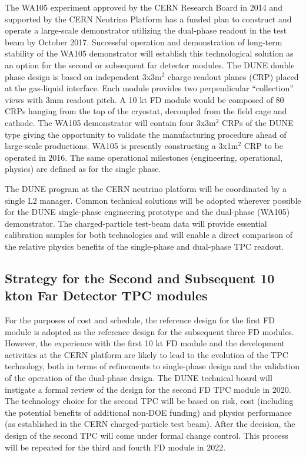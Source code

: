 The WA105 experiment approved by the CERN Research Board in 2014 and supported 
by the CERN Neutrino Platform has a funded plan to construct and operate a large-scale 
demonstrator utilizing the dual-phase readout in the test beam by October 2017. 
Successful operation and demonstration of long-term stability of the WA105 demonstrator 
will establish this technological solution as an option for the second or subsequent 
far detector modules. The DUNE double phase design is based on independent 3x3m$^2$
charge readout planes (CRP) placed at the gas-liquid interface. Each module provides 
two perpendicular ``collection'' views with 3mm readout pitch. A 10 kt FD module 
would be composed of 80 CRPs hanging from the top of the cryostat, decoupled from 
the field cage and cathode. The WA105 demonstrator will contain four 3x3m$^2$ 
CRPs of the DUNE type giving the opportunity to validate the manufacturing procedure 
ahead of large-scale productions. WA105 is presently constructing a 3x1m$^2$ 
CRP to be operated in 2016. The same operational milestones (engineering, operational, 
physics) are defined as for the single phase.

The DUNE program at the CERN neutrino platform will be coordinated by a single 
L2 manager. Common technical solutions will be adopted wherever possible for the 
DUNE single-phase engineering prototype and the dual-phase (WA105) demonstrator. 
The charged-particle test-beam data will provide essential calibration samples 
for both technologies and will enable a direct comparison of the relative physics 
benefits of the single-phase and dual-phase TPC readout. 

\subsection{Strategy for the Second and Subsequent 10 kton Far Detector 
TPC modules}

For the purposes of cost and schedule, the reference design for the first FD module 
is adopted as the reference design for the subsequent three FD modules. However, 
the experience with the first 10 kt FD module and the development activities at 
the CERN platform are likely to lead to the evolution of the TPC technology, both 
in terms of refinements to single-phase design and the validation of the operation 
of the dual-phase design. The DUNE technical board will instigate a formal review 
of the design for the second FD TPC module in 2020. The technology choice for the 
second TPC will be based on risk, cost (including the potential benefits of additional 
non-DOE funding) and physics performance (as established in the CERN charged-particle 
test beam). After the decision, the design of the second TPC will come under formal 
change control. This process will be repeated for the third and fourth FD module 
in 2022.


